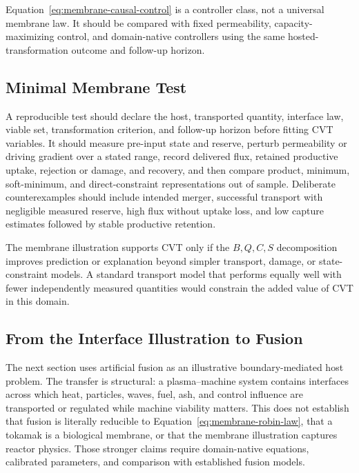 Equation~\eqref{eq:membrane-causal-control} is a controller class, not a universal membrane law. It should be compared with fixed permeability, capacity-maximizing control, and domain-native controllers using the same hosted-transformation outcome and follow-up horizon.

\subsection{Minimal Membrane Test}

A reproducible test should declare the host, transported quantity, interface law, viable set, transformation criterion, and follow-up horizon before fitting CVT variables. It should measure pre-input state and reserve, perturb permeability or driving gradient over a stated range, record delivered flux, retained productive uptake, rejection or damage, and recovery, and then compare product, minimum, soft-minimum, and direct-constraint representations out of sample. Deliberate counterexamples should include intended merger, successful transport with negligible measured reserve, high flux without uptake loss, and low capture estimates followed by stable productive retention.

The membrane illustration supports CVT only if the \(B,Q,C,S\) decomposition improves prediction or explanation beyond simpler transport, damage, or state-constraint models. A standard transport model that performs equally well with fewer independently measured quantities would constrain the added value of CVT in this domain.

\subsection{From the Interface Illustration to Fusion}

The next section uses artificial fusion as an illustrative boundary-mediated host problem. The transfer is structural: a plasma--machine system contains interfaces across which heat, particles, waves, fuel, ash, and control influence are transported or regulated while machine viability matters. This does not establish that fusion is literally reducible to Equation~\eqref{eq:membrane-robin-law}, that a tokamak is a biological membrane, or that the membrane illustration captures reactor physics. Those stronger claims require domain-native equations, calibrated parameters, and comparison with established fusion models.

